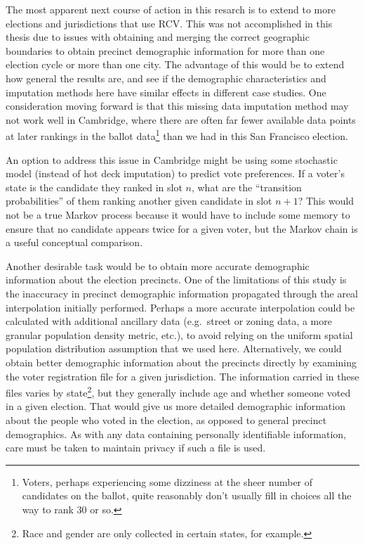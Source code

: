 \documentclass[12pt,twoside]{reedthesis}
\begin{document}
The most apparent next course of action in this resarch is to extend to more elections and jurisdictions that use RCV. This was not accomplished in this thesis due to issues with obtaining and merging the correct geographic boundaries to obtain precinct demographic information for more than one election cycle or more than one city. The advantage of this would be to extend how general the results are, and see if the demographic characteristics and imputation methods here have similar effects in different case studies. One consideration moving forward is that this missing data imputation method may not work well in Cambridge, where there are often far fewer available data points at later rankings in the ballot data\footnote{Voters, perhaps experiencing some dizziness at the sheer number of candidates on the ballot, quite reasonably don't usually fill in choices all the way to rank 30 or so.} than we had in this San Francisco election.

An option to address this issue in Cambridge might be using some stochastic model (instead of hot deck imputation) to predict vote preferences. If a voter's state is the candidate they ranked in slot \(n\), what are the ``transition probabilities'' of them ranking another given candidate in slot \(n + 1\)? This would not be a true Markov process because it would have to include some memory to ensure that no candidate appears twice for a given voter, but the Markov chain is a useful conceptual comparison.

Another desirable task would be to obtain more accurate demographic information about the election precincts. One of the limitations of this study is the inaccuracy in precinct demographic information propagated through the areal interpolation initially performed. Perhaps a more accurate interpolation could be calculated with additional ancillary data (e.g.~street or zoning data, a more granular population density metric, etc.), to avoid relying on the uniform spatial population distribution assumption that we used here. Alternatively, we could obtain better demographic information about the precincts directly by examining the voter registration file for a given jurisdiction. The information carried in these files varies by state\footnote{Race and gender are only collected in certain states, for example.}, but they generally include age and whether someone voted in a given election. That would give us more detailed demographic information about the people who voted in the election, as opposed to general precinct demographics. As with any data containing personally identifiable information, care must be taken to maintain privacy if such a file is used.
\end{document}
